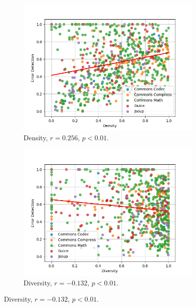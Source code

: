 \documentclass[twoside,a4paper,11pt]{memoir}
\begin{document}

\begin{figure}
    \centering
    \begin{subfigure}[b]{0.49\linewidth}
        \centering
        \includegraphics[width=\linewidth]{figures/error_detection_density}
        \caption{Density, $r=0.256$, $p<0.01$.}
        \label{fig:error_detection_density}
    \end{subfigure}
    \hfill
    \begin{subfigure}[b]{0.49\linewidth}
        \centering
        \includegraphics[width=\linewidth]{figures/error_detection_diversity}
        \caption{Diversity, $r=-0.132$, $p < 0.01$.}
        \label{fig:error_detection_diversity}

\end{subfigure}
\end{figure}
\end{document}
